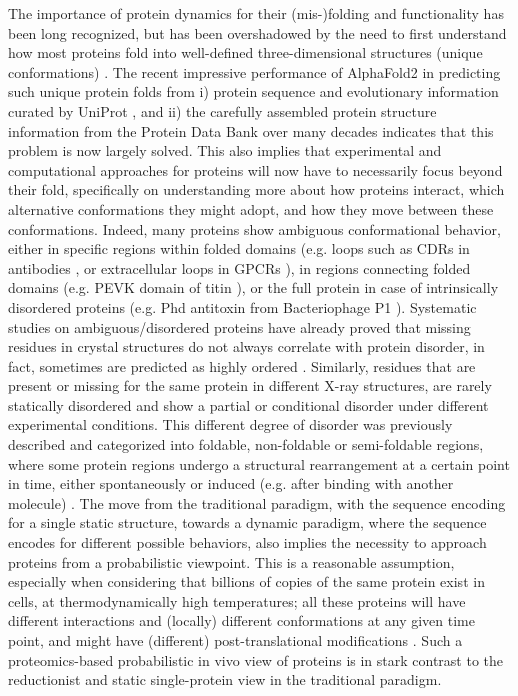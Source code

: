 The importance of protein dynamics for their (mis-)folding \cite{daggett_is_2003, dobson_protein_2003} and functionality \cite{karplus_molecular_2005, glazer_improving_2009} has been long recognized, but has been overshadowed by the need to first understand how most proteins fold into well-defined three-dimensional structures (unique conformations) \cite{hunkapiller_contemporary_1984, berman_worldwide_2007}. The recent impressive performance of AlphaFold2 \cite{jumper_highly_2021} in predicting such unique protein folds from i) protein sequence and evolutionary information curated by UniProt \cite{the_uniprot_consortium_uniprot_2021}, and ii) the carefully assembled protein structure information from the Protein Data Bank over many decades \cite{berman_worldwide_2007} indicates that this problem is now largely solved. This also implies that experimental and computational approaches for proteins will now have to necessarily focus beyond their fold, specifically on understanding more about how proteins interact, which alternative conformations they might adopt, and how they move between these conformations. Indeed, many proteins show ambiguous conformational behavior, either in specific regions within folded domains (e.g. loops such as CDRs in antibodies \cite{armstrong_conformational_2008}, or extracellular loops in GPCRs \cite{hilger_structure_2018}), in regions connecting folded domains (e.g. PEVK domain of titin \cite{hsin_molecular_2011}), or the full protein in case of intrinsically disordered proteins (e.g. Phd antitoxin from Bacteriophage P1 \cite{de_gieter_intrinsically_2014}). Systematic studies on ambiguous/disordered proteins have already proved that missing residues in crystal structures do not always correlate with protein disorder, in fact, sometimes are predicted as highly ordered \cite{gall_intrinsic_2007}. Similarly, residues that are present or missing for the same protein in different X-ray structures, are rarely statically disordered and show a partial or conditional disorder under different experimental conditions. This different degree of disorder was previously described and categorized into foldable, non-foldable or semi-foldable regions, where some protein regions undergo a structural rearrangement at a certain point in time, either spontaneously or induced (e.g. after binding with another molecule) \cite{uversky_unusual_2013}. The move from the traditional paradigm, with the sequence encoding for a single static structure, towards a dynamic paradigm, where the sequence encodes for different possible behaviors, also implies the necessity to approach proteins from a probabilistic viewpoint. This is a reasonable assumption, especially when considering that billions of copies of the same protein exist in cells, at thermodynamically high temperatures; all these proteins will have different interactions and (locally) different conformations at any given time point, and might have (different) post-translational modifications \cite{vu_protein_2018}. Such a proteomics-based probabilistic in vivo view of proteins is in stark contrast to the reductionist and static single-protein view in the traditional paradigm.

